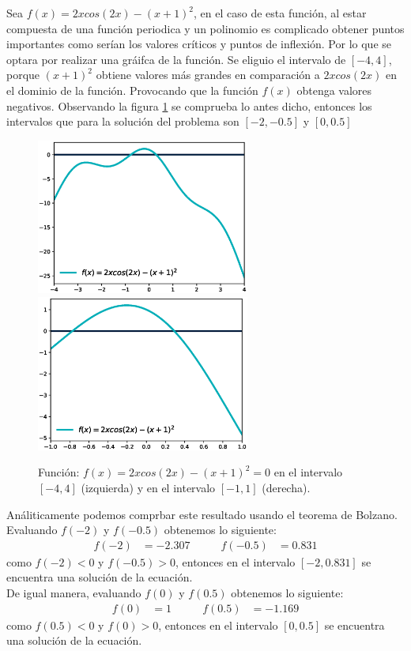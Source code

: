 \begin{enumerate}
          Sea $f(x)=2xcos(2x)-(x+1)^2$, en el caso de esta función, al estar compuesta de una función periodica y un polinomio es complicado obtener puntos importantes como serían los valores críticos y puntos de inflexión. Por lo que se optara por realizar una gráifca de la función. Se eliguio el intervalo de $[-4,4]$, porque $(x+1)^2$ obtiene valores más grandes en comparación a $2xcos(2x)$ en el dominio de la función. Provocando que la función $f(x)$ obtenga valores negativos. Observando la figura \ref{fig:problema1b} se comprueba lo antes dicho, entonces los intervalos que para la solución del problema son $[-2,-0.5]$ y $[0,0.5]$
          \begin{figure}[H]
              \centering
              \includegraphics[width=7cm]{Graphics/function_2.eps}
              \includegraphics[width=7cm]{Graphics/function_2b.eps}
              \caption{Función: $f(x)=2xcos(2x)-(x+1)^2=0$ en el intervalo $[-4,4]$ (izquierda) y  en el intervalo $[-1,1]$ (derecha).}
              \label{fig:problema1b}
          \end{figure}
          Análiticamente podemos comprbar este resultado usando el teorema de Bolzano. Evaluando $f(-2)$ y $f(-0.5)$ obtenemos lo siguiente:
          \begin{align*}
              f(-2) & =  -2.307 & \qquad f(-0.5) & = 0.831
          \end{align*}
          como $f(-2)<0$ y $f(-0.5)>0$, entonces en el intervalo $[-2,0.831]$ se encuentra una solución de la ecuación.\\
          De igual manera, evaluando $f(0)$ y $f(0.5)$ obtenemos lo siguiente:
          \begin{align*}
              f(0) & =  1 & \qquad f(0.5) & = -1.169
          \end{align*}
          como $f(0.5)<0$ y $f(0)>0$, entonces en el intervalo $[0,0.5]$ se encuentra una solución de la ecuación.
\end{enumerate}